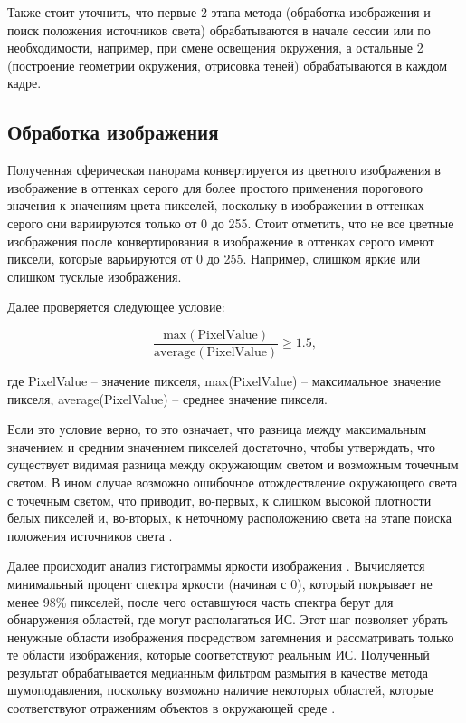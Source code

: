 Также стоит уточнить, что первые 2 этапа метода (обработка изображения и поиск положения источников света) обрабатываются в начале сессии или по необходимости, например, при смене освещения окружения, а остальные 2 (построение геометрии окружения, отрисовка теней) обрабатываются в каждом кадре.

\subsection{Обработка изображения}

Полученная сферическая панорама конвертируется из цветного изображения в изображение в оттенках серого для более простого применения порогового значения к значениям цвета пикселей, поскольку в изображении в оттенках серого они вариируются только от 0 до 255. Стоит отметить, что не все цветные изображения после конвертирования в изображение в оттенках серого имеют пиксели, которые варьируются от 0 до 255. Например, слишком яркие или слишком тусклые изображения.

Далее проверяется следующее условие:

\begin{equation}
	\frac{\text{max}(\text{PixelValue})}{\text{average}(\text{PixelValue})} \geqslant 1.5,
\end{equation}

где PixelValue -- значение пикселя, max(PixelValue) -- максимальное значение пикселя, average(PixelValue) -- среднее значение пикселя.

Если это условие верно, то это означает, что разница между максимальным значением и средним значением пикселей достаточно, чтобы утверждать, что существует видимая разница между окружающим светом и возможным точечным светом. В ином случае возможно ошибочное отождествление окружающего света с точечным светом, что приводит, во-первых, к слишком высокой плотности белых пикселей и, во-вторых, к неточному расположению света на этапе поиска положения источников света \cite{osti2019real}.

Далее происходит анализ гистограммы яркости изображения \cite{img_hists}. Вычисляется минимальный процент спектра яркости (начиная с 0), который покрывает не менее 98\% пикселей, после чего оставшуюся часть спектра берут для обнаружения областей, где могут располагаться ИС. Этот шаг позволяет убрать ненужные области изображения посредством затемнения и рассматривать только те области изображения, которые соответствуют реальным ИС. Полученный результат обрабатывается медианным фильтром размытия в качестве метода шумоподавления, поскольку возможно наличие некоторых областей, которые соответствуют отражениям объектов в окружающей среде \cite{osti2019real}.

